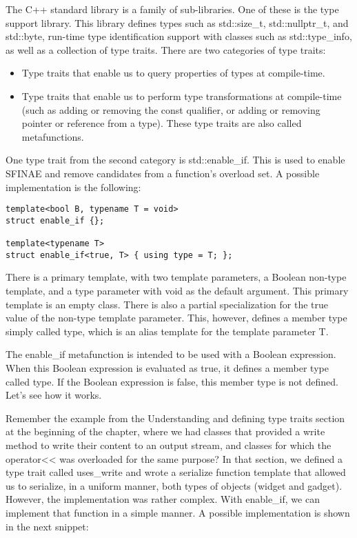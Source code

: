 The C++ standard library is a family of sub-libraries. One of these is the type support library. This library defines types such as std::size\_t, std::nullptr\_t, and std::byte, run-time type identification support with classes such as std::type\_info, as well as a collection of type traits. There are two categories of type traits:

\begin{itemize}
\item
Type traits that enable us to query properties of types at compile-time.

\item
Type traits that enable us to perform type transformations at compile-time (such as adding or removing the const qualifier, or adding or removing pointer or reference from a type). These type traits are also called metafunctions.
\end{itemize}

One type trait from the second category is std::enable\_if. This is used to enable SFINAE and remove candidates from a function’s overload set. A possible implementation is the following:

\begin{lstlisting}[style=styleCXX]
template<bool B, typename T = void>
struct enable_if {};

template<typename T>
struct enable_if<true, T> { using type = T; };
\end{lstlisting}

There is a primary template, with two template parameters, a Boolean non-type template, and a type parameter with void as the default argument. This primary template is an empty class. There is also a partial specialization for the true value of the non-type template parameter. This, however, defines a member type simply called type, which is an alias template for the template parameter T.

The enable\_if metafunction is intended to be used with a Boolean expression. When this Boolean expression is evaluated as true, it defines a member type called type. If the Boolean expression is false, this member type is not defined. Let’s see how it works.

Remember the example from the Understanding and defining type traits section at the beginning of the chapter, where we had classes that provided a write method to write their content to an output stream, and classes for which the operator<{}< was overloaded for the same purpose? In that section, we defined a type trait called uses\_write and wrote a serialize function template that allowed us to serialize, in a uniform manner, both types of objects (widget and gadget). However, the implementation was rather complex. With enable\_if, we can implement that function in a simple manner. A possible implementation is shown in the next snippet:


